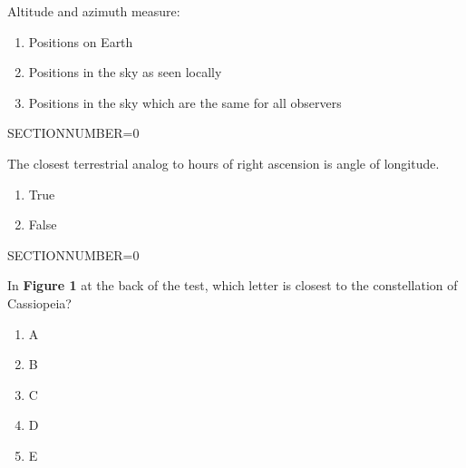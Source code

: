 \documentclass[11pt]{article}
\begin{document}
\begin{enumerate}
\begin{minipage}{\textwidth}
\begin{minipage}{\textwidth}
\item Altitude and azimuth measure:
\begin{enumerate} 
\setlength{\itemsep}{1pt} 
\setlength{\parskip}{0pt} 
\setlength{\parsep}{0pt}
\setlength{\multicolsep}{1pt} 
\item Positions on Earth
\item Positions in the sky as seen locally
\item Positions in the sky which are the same for all observers
\end{enumerate} 
\end{minipage}
SECTIONNUMBER=0
\end{minipage}
\vskip 0.20in

\begin{minipage}{\textwidth}
\begin{minipage}{\textwidth}
\item The closest terrestrial analog to hours of right ascension is angle of longitude.
\begin{multicols}{3}
\begin{enumerate} 
\setlength{\itemsep}{1pt} 
\setlength{\parskip}{0pt} 
\setlength{\parsep}{0pt}
\setlength{\multicolsep}{1pt} 
\item True
\item False
\end{enumerate} 
\vfill 
\end{multicols}

\end{minipage}
SECTIONNUMBER=0
\end{minipage}
\vskip 0.20in

\begin{minipage}{\textwidth}
\begin{minipage}{\textwidth}
\item In {\bf Figure 1} at the back of the test, which letter is closest to the constellation of  Cassiopeia?
\begin{multicols}{3}
\begin{enumerate} 
\setlength{\itemsep}{1pt} 
\setlength{\parskip}{0pt} 
\setlength{\parsep}{0pt}
\setlength{\multicolsep}{1pt} 
\item A
\item B
\item C
\item D
\item E
\end{enumerate} 
\vfill 
\end{multicols}


\end{minipage}
\end{minipage}
\end{enumerate}
\end{document}
